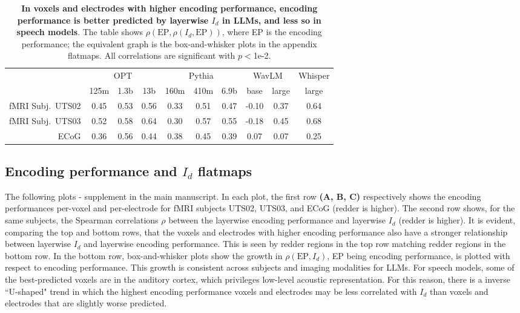 \documentclass{article}
\theoremstyle{plain}
\theoremstyle{definition}
\theoremstyle{remark}
\begin{document}
\begin{table}[h]
    \caption{\textbf{In voxels and electrodes with higher encoding performance, encoding performance is better predicted by layerwise $I_d$ in LLMs, and less so in speech models}. The table shows $\rho(\text{EP}, \rho(I_d, \text{EP}))$, where EP is the encoding performance; the equivalent graph is the box-and-whisker plots in the appendix flatmaps. All correlations are significant with $p<$1e-2.}
    \label{tab:app_higher_ep_higher_ep_id}
    \centering
    \begin{tabular}{r|ccc|ccc|cc|c}
    & \multicolumn{3}{c|}{OPT} 
    & \multicolumn{3}{c|}{Pythia} 
    & \multicolumn{2}{c|}{WavLM} 
    & \multicolumn{1}{c}{Whisper} \\
    & 125m & 1.3b & 13b 
    & 160m & 410m & 6.9b 
    & base & large 
    & large \\
    \hline
        fMRI Subj.~UTS02   
        & 0.45 & 0.53 & 0.56 
        & 0.33 & 0.51 &  0.47
        & -0.10 & 0.37 & 0.64 \\
        fMRI Subj.~UTS03  
        & 0.52 & 0.58 &  0.64
        & 0.30 & 0.57 & 0.55
        & -0.18 & 0.45 & 0.68 \\
        ECoG   
        & 0.36 & 0.56 & 0.44
        & 0.38 & 0.45 & 0.39
        & 0.07 & 0.07 & 0.25 \\
        \hline 
\end{tabular}
\end{table}

\FloatBarrier
\subsection{Encoding performance and $I_d$ flatmaps}
The following plots - supplement  in the main manuscript. In each plot, the first row \textbf{(A, B, C)} respectively shows the encoding performances per-voxel and per-electrode for fMRI subjects UTS02, UTS03, and ECoG (redder is higher). The second row shows, for the same subjects, the Spearman correlations $\rho$ between the layerwise encoding performance and layerwise $I_d$ (redder is higher). It is evident, comparing the top and bottom rows, that the voxels and electrodes with higher encoding performance also have a stronger relationship between layerwise $I_d$ and layerwise encoding performance. This is seen by redder regions in the top row matching redder regions in the bottom row. In the bottom row, box-and-whisker plots show the growth in $\rho(\text{EP}, I_d)$, EP being encoding performance, is plotted with respect to encoding performance. This growth is consistent across subjects and imaging modalities for LLMs. For speech models, some of the best-predicted voxels are in the auditory cortex, which privileges low-level acoustic representation. For this reason, there is a inverse ``U-shaped" trend in which the highest encoding performance voxels and electrodes may be less correlated with $I_d$ than voxels and electrodes that are slightly worse predicted. 
\end{document}
